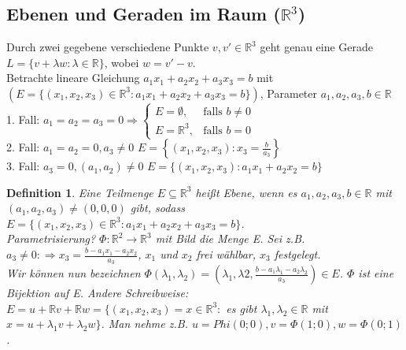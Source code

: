 \documentclass[12pt,a4paper]{article}
\theoremstyle{plain}
\newtheorem{Definition}[Theorem]{Definition}
\newcommand{\R}{\mathbb{R}}
\numberwithin{equation}{section}
\begin{document}
\subsection{Ebenen und Geraden im Raum ($\R^3$)}
Durch zwei gegebene verschiedene Punkte $v,v'\in\R^3$ geht genau eine Gerade $L=\{v+\lambda w: \lambda\in \R\}$, wobei $w=v'-v$.\\
Betrachte lineare Gleichung $a_1x_1+a_2x_2+a_3x_3=b$ mit $(E=\{(x_1,x_2,x_3)\in\R^3: a_1x_1+a_2x_2+a_3x_3=b\})$, Parameter $a_1,a_2,a_3,b\in\R$\\
1. Fall: $a_1=a_2=a_3=0\Rightarrow \left\lbrace\begin{array}{ll}E=\emptyset,&\text{falls }b\neq 0 \\ E=\R^3,&\text{falls }b=0 \end{array}\right.$\\
2. Fall: $a_1=a_2=0,a_3\neq 0$ $E=\left\lbrace(x_1,x_2,x_3):x_3=\frac{b}{a_3}\right\rbrace$\\
3. Fall: $a_3=0,(a_1,a_2)\neq 0$ $E=\{(x_1,x_2,x_3):a_1 x_1+a_2 x_2=b\}$
\begin{Definition}
Eine Teilmenge $E\subseteq \R^3$ heißt Ebene, wenn es $a_1,a_2,a_3,b\in\R$ mit $(a_1,a_2,a_3)\neq (0,0,0)$ gibt, sodass $E=\{(x_1,x_2,x_3)\in\R^3:a_1x_1+a_2x_2+a_3x_3=b\}$.\\
Parametrisierung? $\Phi:\R^2\rightarrow \R^3$ mit Bild die Menge E. Sei z.B. $a_3\neq 0: \Rightarrow x_3=\frac{b-a_1x_1-a_2x_2}{a_3}$, $x_1$ und $x_2$ frei wählbar, $x_3$ festgelegt. \\
Wir können nun bezeichnen $\Phi(\lambda_1,\lambda_2)=\left(\lambda_1,\lambda2,\frac{b-a_1\lambda_1-a_2\lambda_2}{a_3}\right)\in E$. $\Phi$ ist eine Bijektion auf E. Andere Schreibweise: $E=u+\R v+\R w=\{(x_1,x_2,x_3)=x\in\R^3:$ es gibt $\lambda_1,\lambda_2\in \R$ mit $x=u+\lambda_1 v+\lambda_2 w\}$. Man nehme z.B. $u=Phi(0;0),v=\Phi(1;0),w=\Phi(0;1)$.
\end{Definition}
\end{document}
